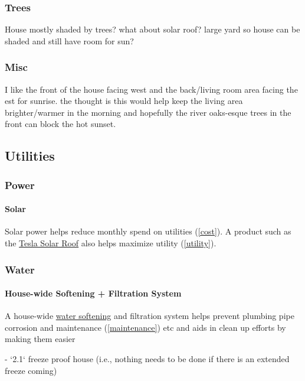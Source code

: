 \documentclass{article}
\begin{document}
\subsubsection{Trees}
House mostly shaded by trees? what about solar roof? large yard so house can be shaded and still have room for sun?

\subsubsection{Misc}
I like the front of the house facing west and the back/living room area facing the est for sunrise. the thought is this would help keep the living area brighter/warmer in the morning and hopefully the river oaks-esque trees in the front can block the hot sunset.

\subsection{Utilities}
\subsubsection{Power}
\paragraph{Solar}
Solar power helps reduce monthly spend on utilities (\ref{cost}). A product such as the \href{https://www.tesla.com/solarroof}{Tesla Solar Roof} also helps maximize utility (\ref{utility}).

\subsubsection{Water}
\paragraph{House-wide Softening + Filtration System}
A house-wide \href{https://en.wikipedia.org/wiki/Water_softening}{water softening} and filtration system helps prevent plumbing pipe corrosion and maintenance (\ref{maintenance}) etc and aids in clean up efforts by making them easier


- `2.1` freeze proof house (i.e., nothing needs to be done if there is an extended freeze coming)
\end{document}
